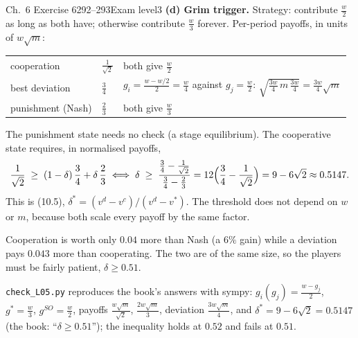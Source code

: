 \begin{exsol}{\MG{} Ch.~6 Exercise 6}{292--293}{Exam level}{3}
\textbf{(d) Grim trigger.} Strategy: contribute $\frac w2$ as long as both have; otherwise contribute $\frac w3$
forever. Per-period payoffs, in units of $w\sqrt m$:
\begin{center}
\begin{tabular}{lll}
\toprule
cooperation & $\frac{1}{\sqrt2}$ & both give $\frac w2$ \\
best deviation & $\frac34$ & $g_i = \frac{w - w/2}{2} = \frac w4$ against $g_j = \frac w2$:
 $\sqrt{\tfrac{3w}{4}\,m\,\tfrac{3w}{4}} = \frac{3w}{4}\sqrt m$ \\
punishment (Nash) & $\frac23$ & both give $\frac w3$ \\
\bottomrule
\end{tabular}
\end{center}
The punishment state needs no check (a stage equilibrium). The cooperative state requires, in
normalised payoffs,
\[
  \frac{1}{\sqrt2} \;\ge\; (1-\delta)\,\frac34 + \delta\,\frac23
  \iff \delta \;\ge\; \frac{\frac34 - \frac1{\sqrt2}}{\frac34 - \frac23}
  = 12\Bigl(\frac34 - \frac{1}{\sqrt2}\Bigr) = 9 - 6\sqrt2 \approx 0.5147 .
\]
This is (10.5), $\delta^* = (v^d - v^c)/(v^d - v^*)$. The threshold does not depend on $w$ or $m$, because both
scale every payoff by the same factor.

\interp Cooperation is worth only $0.04$ more than Nash (a $6\%$ gain) while a deviation pays $0.043$
more than cooperating. The two are of the same size, so the players must be fairly patient, $\delta \ge 0.51$.

\verify \texttt{check\_L05.py} reproduces the book's answers with sympy: $g_i(g_j) = \frac{w-g_j}{2}$, $g^* = \frac w3$,
$g^{SO} = \frac w2$, payoffs $\frac{w\sqrt m}{\sqrt2}$, $\frac{2w\sqrt m}{3}$, deviation $\frac{3w\sqrt m}{4}$, and
$\delta^* = 9 - 6\sqrt2 = 0.5147$ (the book: ``$\delta \ge 0.51$''); the inequality holds at $0.52$ and fails at $0.51$.

\end{exsol}
